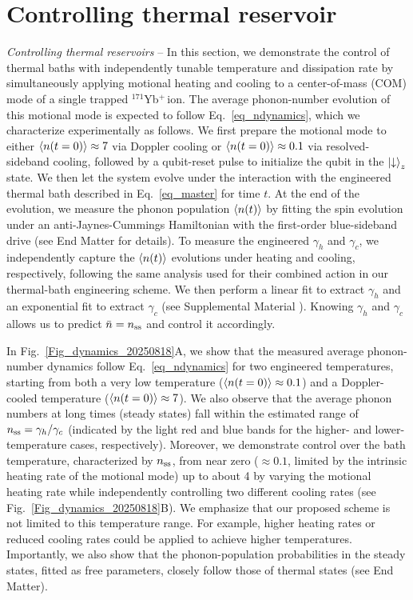 \documentclass[
reprint,
superscriptaddress,

amsmath,amssymb,
aps,
prl,

floatfix,
]{revtex4-2}
\newcommand{\Yb}{$^{171}$Yb$^+\,$}
\begin{document}
\section{Controlling thermal reservoir}
\fi
\emph{Controlling thermal reservoirs} -- In this section, we demonstrate the control of thermal baths with independently tunable temperature and dissipation rate by simultaneously applying motional heating and cooling to a center-of-mass (COM) mode of a single trapped \Yb ion. The average phonon-number evolution of this motional mode is expected to follow Eq.~\eqref{eq_ndynamics}, which we characterize experimentally as follows. We first prepare the motional mode to either $\braket{n(t=0)}\approx7$ via Doppler cooling or $\braket{n(t=0)}\approx0.1$ via resolved-sideband cooling, followed by a qubit-reset pulse to initialize the qubit in the $\ket{\downarrow}_z$ state. We then let the system evolve under the interaction with the engineered thermal bath described in Eq.~\eqref{eq_master} for time $t$. At the end of the evolution, we measure the phonon population $\braket{n(t)}$ by fitting the spin evolution under an anti-Jaynes-Cummings Hamiltonian with the first-order blue-sideband drive (see End Matter for details).
To measure the engineered $\gamma_h$ and $\gamma_c$, we independently capture the $\braket{n(t)}$ evolutions under heating and cooling, respectively, following the same analysis used for their combined action in our thermal-bath engineering scheme. We then perform a linear fit to extract $\gamma_h$ and an exponential fit to extract $\gamma_c$ (see Supplemental Material \cite{so2025fT_supp}). Knowing $\gamma_h$ and $\gamma_c$ allows us to predict $\bar{n}=n_{\rm ss}$ and control it accordingly.

In Fig.~\ref{Fig_dynamics_20250818}A, we show that the measured average phonon-number dynamics follow Eq.~\eqref{eq_ndynamics} for two engineered temperatures, starting from both a very low temperature ($\braket{n(t=0)}\approx 0.1$) and a Doppler-cooled temperature ($\braket{n(t=0)}\approx 7$). We also observe that the average phonon numbers at long times (steady states) fall within the estimated range of $n_{\rm ss} = \gamma_h/\gamma_c$ (indicated by the light red and blue bands for the higher- and lower-temperature cases, respectively). Moreover, we demonstrate control over the bath temperature, characterized by $n_{\rm ss}$, from near zero ($\approx 0.1$, limited by the intrinsic heating rate of the motional mode) up to about 4 by varying the motional heating rate while independently controlling two different cooling rates (see Fig.~\ref{Fig_dynamics_20250818}B). We emphasize that our proposed scheme is not limited to this temperature range. For example, higher heating rates or reduced cooling rates could be applied to achieve higher temperatures. Importantly, we also show that the phonon-population probabilities in the steady states, fitted as free parameters, closely follow those of thermal states (see End Matter).
\end{document}
